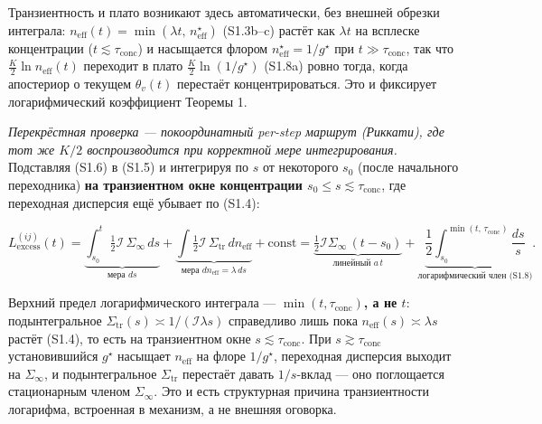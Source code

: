\documentclass[12pt]{iopart}
\begin{document}
Транзиентность и плато возникают здесь автоматически, без внешней обрезки интеграла: \(n_{\text{eff}}(t)=\min(\lambda t,\,n_{\text{eff}}^\star)\) (S1.3b--c) растёт как \(\lambda t\) на всплеске концентрации (\(t\lesssim\tau_{\text{conc}}\)) и насыщается флором \(n_{\text{eff}}^\star=1/g^\star\) при \(t\gg\tau_{\text{conc}}\), так что \(\tfrac{K}{2}\ln n_{\text{eff}}(t)\) переходит в плато \(\tfrac{K}{2}\ln(1/g^\star)\) (S1.8a) ровно тогда, когда апостериор о текущем \(\theta_v(t)\) перестаёт концентрироваться. Это и фиксирует логарифмический коэффициент Теоремы 1.



\emph{Перекрёстная проверка --- покоординатный per-step маршрут (Риккати), где тот же \(K/2\) воспроизводится при корректной мере интегрирования.} Подставляя (S1.6) в (S1.5) и интегрируя по \(s\) от некоторого \(s_0\) (после начального переходника) \textbf{на транзиентном окне концентрации \(s_0 \le s \lesssim \tau_{\text{conc}}\)}, где переходная дисперсия ещё убывает по (S1.4):



\begin{equation}L_{\text{excess}}^{(ij)}(t) = \underbrace{\int_{s_0}^t \tfrac12\mathcal I\,\Sigma_\infty\,ds}_{\text{мера } ds} + \underbrace{\int \tfrac12\mathcal I\,\Sigma_{\text{tr}}\,dn_{\text{eff}}}_{\text{мера } dn_{\text{eff}}=\lambda\,ds} + \text{const} = \underbrace{\tfrac12\mathcal I\Sigma_\infty\,(t-s_0)}_{\text{линейный } a\,t} + \underbrace{\frac12\int_{s_0}^{\min(t,\,\tau_{\text{conc}})}\frac{ds}{s}}_{\text{логарифмический член (S1.8)}}. \tag{S1.7}\end{equation}



Верхний предел логарифмического интеграла --- \textbf{\(\min(t,\tau_{\text{conc}})\), а не \(t\)}: подынтегральное \(\Sigma_{\text{tr}}(s) \asymp 1/(\mathcal I\lambda s)\) справедливо лишь пока \(n_{\text{eff}}(s)\asymp\lambda s\) растёт (S1.4), то есть на транзиентном окне \(s \lesssim \tau_{\text{conc}}\). При \(s \gtrsim \tau_{\text{conc}}\) установившийся \(g^\star\) насыщает \(n_{\text{eff}}\) на флоре \(1/g^\star\), переходная дисперсия выходит на \(\Sigma_\infty\), и подынтегральное \(\Sigma_{\text{tr}}\) перестаёт давать \(1/s\)-вклад --- оно поглощается стационарным членом \(\Sigma_\infty\). Это и есть структурная причина транзиентности логарифма, встроенная в механизм, а не внешняя оговорка.
\end{document}
